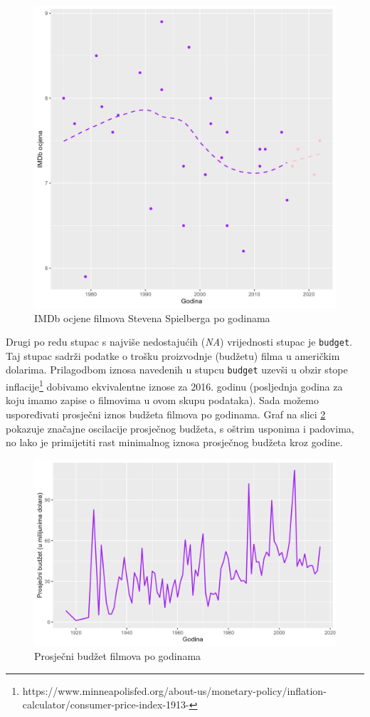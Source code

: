 	\begin{figure}[H]
		\centering
		\includegraphics[width=15cm]{../figures/analysis/spielberg.png}
		\caption{IMDb ocjene filmova Stevena Spielberga po godinama}
		\label{spielberg}
	\end{figure}
	
	Drugi po redu stupac s najviše nedostajućih (\textit{NA}) vrijednosti stupac je \texttt{budget}. Taj stupac sadrži podatke o trošku proizvodnje (budžetu) filma u američkim dolarima. Prilagodbom iznosa navedenih u stupcu \texttt{budget} uzevši u obzir stope inflacije\footnote{https://www.minneapolisfed.org/about-us/monetary-policy/inflation-calculator/consumer-price-index-1913-} dobivamo ekvivalentne iznose za 2016. godinu (posljednja godina za koju imamo zapise o filmovima u ovom skupu podataka). Sada možemo uspoređivati prosječni iznos budžeta filmova po godinama. Graf na slici \ref{budzet} pokazuje značajne oscilacije prosječnog budžeta, s oštrim usponima i padovima, no lako je primijetiti rast minimalnog iznosa prosječnog budžeta kroz godine.
	  
	\begin{figure}[H]
		\centering
		\includegraphics[width=15cm]{../figures/analysis/prosjecni_budzet.png}
		\caption{Prosječni budžet filmova po godinama}
		\label{budzet}
	\end{figure}
	
	
	
	
	
	
	
	
	
	
	